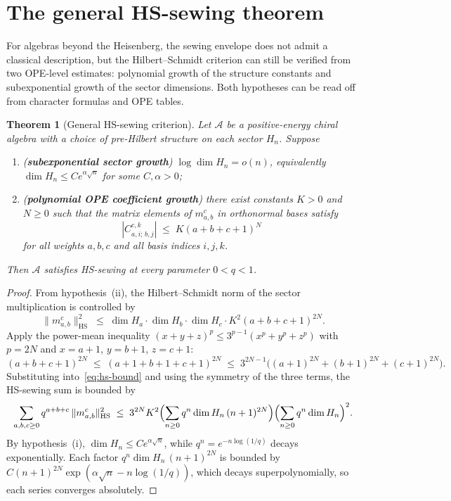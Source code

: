 \documentclass[11pt,reqno]{amsart}
\newtheorem{theorem}{Theorem}[section]
\theoremstyle{definition}
\theoremstyle{remark}
\newcommand{\cA}{\mathcal{A}}
\newcommand{\HS}{\mathrm{HS}}
\numberwithin{equation}{section}
\begin{document}
\section{The general HS-sewing theorem}\label{sec:general-criterion}

For algebras beyond the Heisenberg, the sewing envelope does not
admit a classical description, but the Hilbert--Schmidt criterion
can still be verified from two OPE-level estimates: polynomial
growth of the structure constants and subexponential growth of
the sector dimensions. Both hypotheses can be read off from
character formulas and OPE tables.

\begin{theorem}[General HS-sewing criterion]
\label{thm:general-hs-sewing}
Let $\cA$ be a positive-energy chiral algebra with a choice of
pre-Hilbert structure on each sector $H_n$. Suppose
\begin{enumerate}[label=\textup{(\roman*)}]
\item (\textbf{subexponential sector growth})
$\log\dim H_n = o(n)$, equivalently
$\dim H_n \leq C e^{\alpha\sqrt{n}}$ for some
$C, \alpha > 0$;
\item (\textbf{polynomial OPE coefficient growth}) there exist
constants $K > 0$ and $N \geq 0$ such that the matrix elements
of $m_{a,b}^c$ in orthonormal bases satisfy
\[
|C^{c,k}_{a,i;\,b,j}| \;\leq\; K(a + b + c + 1)^N
\]
for all weights $a, b, c$ and all basis indices $i, j, k$.
\end{enumerate}
Then $\cA$ satisfies HS-sewing at every parameter
$0 < q < 1$.
\end{theorem}

\begin{proof}
From hypothesis~(ii), the Hilbert--Schmidt norm of the sector
multiplication is controlled by
\begin{equation}\label{eq:hs-bound}
\|m_{a,b}^c\|_{\HS}^2
\;\leq\;
\dim H_a \cdot \dim H_b \cdot \dim H_c \cdot
K^2 (a + b + c + 1)^{2N}.
\end{equation}
Apply the power-mean inequality
$(x + y + z)^p \leq 3^{p-1}(x^p + y^p + z^p)$ with $p = 2N$ and
$x = a+1$, $y = b+1$, $z = c+1$:
\[
(a + b + c + 1)^{2N}
\;\leq\;
(a+1+b+1+c+1)^{2N}
\;\leq\;
3^{2N-1}\bigl((a+1)^{2N} + (b+1)^{2N} + (c+1)^{2N}\bigr).
\]
Substituting into~\eqref{eq:hs-bound} and using the symmetry of
the three terms, the HS-sewing sum is bounded by
\[
\sum_{a, b, c \geq 0}
q^{a+b+c}\, \|m_{a,b}^c\|_{\HS}^2
\;\leq\;
3^{2N} K^2
\Bigl(\sum_{n \geq 0} q^n\dim H_n\,(n+1)^{2N}\Bigr)
\Bigl(\sum_{n \geq 0} q^n \dim H_n\Bigr)^2.
\]
By hypothesis~(i), $\dim H_n \leq C e^{\alpha\sqrt{n}}$, while
$q^n = e^{-n\log(1/q)}$ decays exponentially. Each factor
$q^n\dim H_n\,(n+1)^{2N}$ is bounded by
$C(n+1)^{2N}\exp(\alpha\sqrt n - n\log(1/q))$, which decays
superpolynomially, so each series converges absolutely.
\end{proof}
\end{document}
